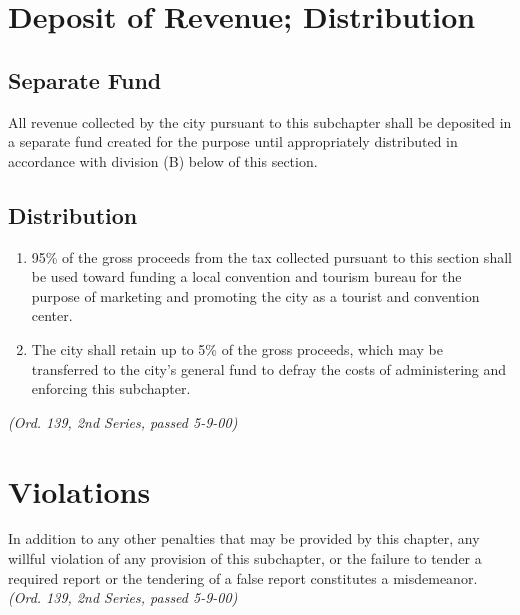 \section{Deposit of Revenue; Distribution}
\subsection{Separate Fund}
All revenue collected by the city pursuant to this subchapter shall be deposited in a separate fund created for the purpose until appropriately distributed in accordance with division (B) below of this section.
\subsection{Distribution}
\begin{enumerate}
    \item 95\% of the gross proceeds from the tax collected pursuant to this section shall be used toward funding a local convention and tourism bureau for the purpose of marketing and promoting the city as a tourist and convention center.
    \item The city shall retain up to 5\% of the gross proceeds, which may be transferred to the city’s general fund to defray the costs of administering and enforcing this subchapter.\\
\end{enumerate}
\emph{(Ord. 139, 2nd Series, passed 5-9-00)}

\section{Violations}
In addition to any other penalties that may be provided by this chapter, any willful violation of any provision of this subchapter, or the failure to tender a required report or the tendering of a false report constitutes a misdemeanor.\\
\emph{(Ord. 139, 2nd Series, passed 5-9-00)}
